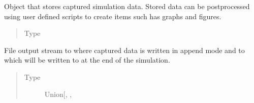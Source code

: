 \documentclass[letterpaper,10pt,english]{sphinxmanual}
\begin{document}
\begin{fulllineitems}
\begin{fulllineitems}
\begin{quote}
\begin{description}
\end{description}\end{quote}

\end{fulllineitems}


\begin{fulllineitems}
\label{\detokenize{app.domain.helpers:app.domain.helpers.smart_dataclasses.FileData.logger}}
Object that stores captured simulation data. Stored data can be
post\sphinxhyphen{}processed using user defined scripts to create items such
has graphs and figures.
\begin{quote}\begin{description}
\item[{Type}] \leavevmode
{\hyperref[\detokenize{app.domain.helpers:app.domain.helpers.smart_dataclasses.LoggingData}]{}}

\end{description}\end{quote}

\end{fulllineitems}


\begin{fulllineitems}
\label{\detokenize{app.domain.helpers:app.domain.helpers.smart_dataclasses.FileData.out_file}}
File output stream to where captured data is written in append
mode and to which  will be written to at the end of the
simulation.
\begin{quote}\begin{description}
\item[{Type}] \leavevmode
Union{[}, , \sphinxhref{https://docs.python.org/3.7/library/functions.html\#int}{int}{]}

\end{description}\end{quote}

\end{fulllineitems}


\end{fulllineitems}
\end{document}
